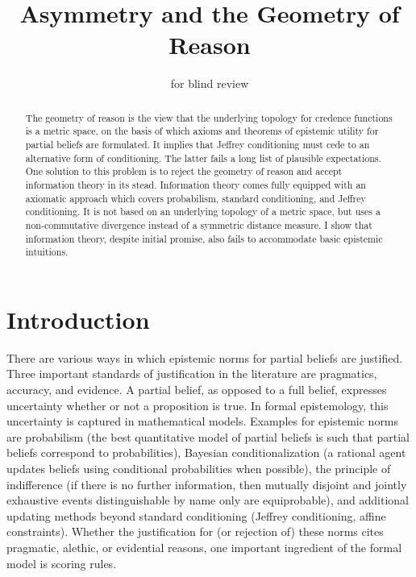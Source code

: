 \documentclass[12pt]{article}
\begin{document}

\title{Asymmetry and the Geometry of Reason}
\author{for blind review}
\date{}
\maketitle

\begin{abstract}
  {\noindent}The geometry of reason is the view that the underlying
  topology for credence functions is a metric space, on the basis of
  which axioms and theorems of epistemic utility for partial beliefs
  are formulated. It implies that Jeffrey conditioning must cede to an
  alternative form of conditioning. The latter fails a long list of
  plausible expectations. One solution to this problem is to reject
  the geometry of reason and accept information theory in its stead.
  Information theory comes fully equipped with an axiomatic approach
  which covers probabilism, standard conditioning, and Jeffrey
  conditioning. It is not based on an underlying topology of a metric
  space, but uses a non-commutative divergence instead of a symmetric
  distance measure. I show that information theory, despite initial
  promise, also fails to accommodate basic epistemic intuitions.
\end{abstract}

\section{Introduction}
\label{intr}

There are various ways in which epistemic norms for partial
beliefs are justified. Three important standards of justification in
the literature are pragmatics, accuracy, and evidence. A partial
belief, as opposed to a full belief, expresses uncertainty whether or
not a proposition is true. In formal epistemology, this uncertainty is
captured in mathematical models. Examples for epistemic norms are
probabilism (the best quantitative model of partial beliefs is such
that partial beliefs correspond to probabilities), Bayesian
conditionalization (a rational agent updates beliefs using conditional
probabilities when possible), the principle of indifference (if there
is no further information, then mutually disjoint and jointly
exhaustive events distinguishable by name only are equiprobable), and
additional updating methods beyond standard conditioning (Jeffrey
conditioning, affine constraints). Whether the justification for (or
rejection of) these norms cites pragmatic, alethic, or evidential
reasons, one important ingredient of the formal model is scoring
rules.
\end{document}

